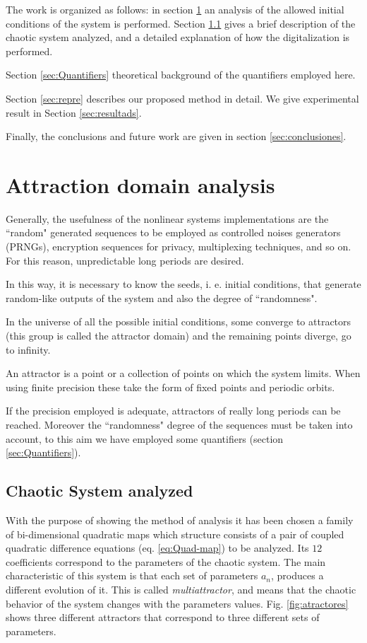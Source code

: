 \documentclass[conference]{IEEEtran}
\begin{document}
The work is organized as follows: in section \ref{sec:estudio} an
analysis of the allowed initial conditions of the system is
performed. Section \ref{sec:caos} gives a brief description of the
chaotic system analyzed, and a detailed explanation of how the
digitalization is performed.

Section \ref{sec:Quantifiers} theoretical background of the quantifiers employed here.

Section \ref{sec:repre} describes our proposed method in detail.
We give experimental result in Section \ref{sec:resultads}.

Finally, the conclusions and future work are given in section
\ref{sec:conclusiones}.


\section{Attraction domain analysis} \label{sec:estudio}

Generally, the usefulness of the nonlinear systems implementations
are the ``random" generated sequences to be employed as controlled
noises generators (PRNGs), encryption sequences for privacy,
multiplexing techniques, and so on. For this reason, unpredictable
long periods are desired.

In this way, it is necessary to know the seeds, i. e. initial
conditions, that generate random-like outputs of the system and
also the degree of ``randomness".

In the universe of all the possible initial conditions, some
converge to attractors (this group is called the attractor domain)
and the remaining points diverge, go to infinity.

An attractor is a point or a collection of points on which the
system limits. When using finite precision these take the form of
fixed points and periodic orbits.

If the precision employed is adequate, attractors of really long
periods can be reached. Moreover the ``randomness" degree of the
sequences must be taken into account, to this aim we have employed
some quantifiers (section \ref{sec:Quantifiers}).

\subsection{Chaotic System analyzed}\label{sec:caos}

With the purpose of showing the method of analysis it has been chosen a family of bi-dimensional quadratic maps which
structure consists of a pair of coupled quadratic difference
equations (eq. \ref{eq:Quad-map}) to be analyzed. Its $12$
coefficients correspond to the parameters of the chaotic system.
The main characteristic of this system is that each set of
parameters $a_n$, produces a different evolution of it. This is
called \textit{multiattractor}, and means that the chaotic
behavior of the system changes with the parameters values. Fig.
\ref{fig:atractores} shows three different attractors that
correspond to three different sets of parameters.
\end{document}
